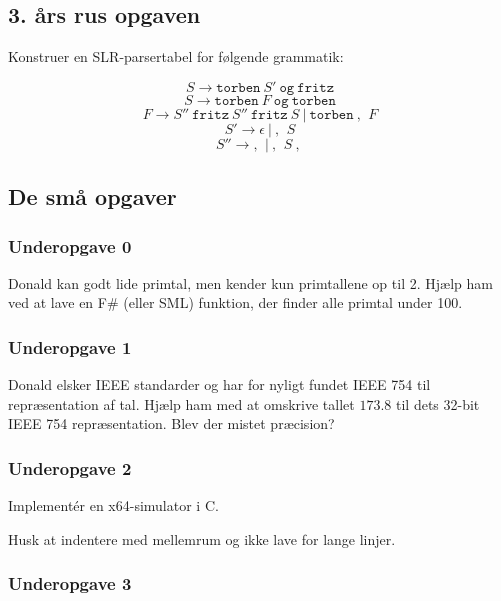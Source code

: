 \subsection{3. års rus opgaven}
Konstruer en SLR-parsertabel for følgende grammatik:

\[
S \rightarrow \texttt{torben}\ S'\ \texttt{og}\ \texttt{fritz}
\]
\[
S \rightarrow \texttt{torben}\ F\ \texttt{og}\ \texttt{torben}
\]
\[
F \rightarrow S''\ \texttt{fritz}\ S''\ \texttt{fritz}\ S\ |\ \texttt{torben}\ \texttt{, }\ F
\]
\[
S' \rightarrow \epsilon\ |\ \texttt{, }\ S
\]
\[
S'' \rightarrow \texttt{, }\ |\ \texttt{, }\ S\ \texttt{, }
\]

\newpage

\subsection{De små opgaver}
\vspace{-0.1cm}

\subsubsection{Underopgave 0}
\vspace{-0.2cm}

Donald kan godt lide primtal, men kender kun primtallene op til 2. Hjælp ham
ved at lave en F\# (eller SML) funktion, der finder alle primtal under 100.

\subsubsection{Underopgave 1}

Donald elsker IEEE standarder og har for nyligt fundet IEEE 754 til
repræsentation af tal. Hjælp ham med at omskrive tallet $173.8$ til dets
32-bit IEEE 754 repræsentation. Blev der mistet præcision?


\subsubsection{Underopgave 2}
\vspace{-0.2cm}

Implementér en x64-simulator i C.

Husk at indentere med mellemrum og ikke lave for lange linjer.

\subsubsection{Underopgave 3}
\vspace{-0.2cm}

